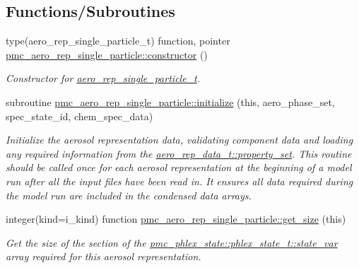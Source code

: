 \subsection*{Functions/\+Subroutines}
\begin{DoxyCompactItemize}
\item 
type(aero\+\_\+rep\+\_\+single\+\_\+particle\+\_\+t) function, pointer \mbox{\hyperlink{namespacepmc__aero__rep__single__particle_a610bc0a2fce99673f7e593667eff1b7e}{pmc\+\_\+aero\+\_\+rep\+\_\+single\+\_\+particle\+::constructor}} ()
\begin{DoxyCompactList}\small\item\em Constructor for \mbox{\hyperlink{structpmc__aero__rep__single__particle_1_1aero__rep__single__particle__t}{aero\+\_\+rep\+\_\+single\+\_\+particle\+\_\+t}}. \end{DoxyCompactList}\item 
subroutine \mbox{\hyperlink{namespacepmc__aero__rep__single__particle_a68b301b8be296690e52b600ecaab5125}{pmc\+\_\+aero\+\_\+rep\+\_\+single\+\_\+particle\+::initialize}} (this, aero\+\_\+phase\+\_\+set, spec\+\_\+state\+\_\+id, chem\+\_\+spec\+\_\+data)
\begin{DoxyCompactList}\small\item\em Initialize the aerosol representation data, validating component data and loading any required information from the {\ttfamily \mbox{\hyperlink{structpmc__aero__rep__data_1_1aero__rep__data__t_a87b1bf5cd10a0a2b51390fb24ebf56c5}{aero\+\_\+rep\+\_\+data\+\_\+t\+::property\+\_\+set}}}. This routine should be called once for each aerosol representation at the beginning of a model run after all the input files have been read in. It ensures all data required during the model run are included in the condensed data arrays. \end{DoxyCompactList}\item 
integer(kind=i\+\_\+kind) function \mbox{\hyperlink{namespacepmc__aero__rep__single__particle_a9f4a932c43b2ac0c227a2695be56837a}{pmc\+\_\+aero\+\_\+rep\+\_\+single\+\_\+particle\+::get\+\_\+size}} (this)
\begin{DoxyCompactList}\small\item\em Get the size of the section of the {\ttfamily \mbox{\hyperlink{structpmc__phlex__state_1_1phlex__state__t_a78835cb552d483ebbfc7a6bc6f756918}{pmc\+\_\+phlex\+\_\+state\+::phlex\+\_\+state\+\_\+t\+::state\+\_\+var}}} array required for this aerosol representation. \end{DoxyCompactList}\item 

\end{DoxyCompactItemize}
